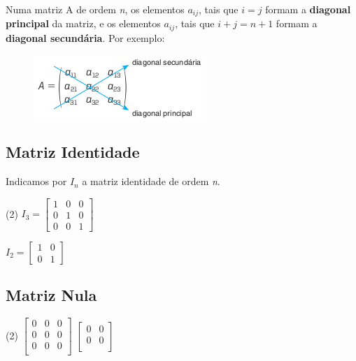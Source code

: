 Numa matriz A de ordem \textit{n}, os elementos $a_{ij}$, tais que $i = j$ formam a \textbf{diagonal principal} da matriz, e os elementos 
$a_{ij}$, tais que $i + j = n + 1$ formam a \textbf{diagonal secundária}. Por exemplo:

\begin{figure}[htb!]
  \centering
  \includegraphics[width=.3\linewidth]{images/quadrada.png}
\end{figure}

\subsection{Matriz Identidade}


Indicamos por $I_n$ a matriz identidade de ordem \textit{n}.

\begin{examples}\leavevmode
  \begin{tasks}(2)
    \task $I_3 = \begin{bmatrix}
      1 & 0 & 0 \\
      0 & 1 & 0 \\
      0 & 0 & 1
    \end{bmatrix}$

    \task $I_2 = \begin{bmatrix}
      1 & 0 \\
      0 & 1
    \end{bmatrix}$
  \end{tasks}
\end{examples}

\subsection{Matriz Nula}


\begin{examples}\leavevmode
  \begin{tasks}(2)
    \task 
  $\begin{bmatrix}
    0 & 0 & 0 \\
    0 & 0 & 0 \\
    0 & 0 & 0 \\
  \end{bmatrix}$
  \task $\begin{bmatrix}
    0 & 0 \\
    0 & 0 \\
  \end{bmatrix}$
  \end{tasks}
  
\end{examples}

